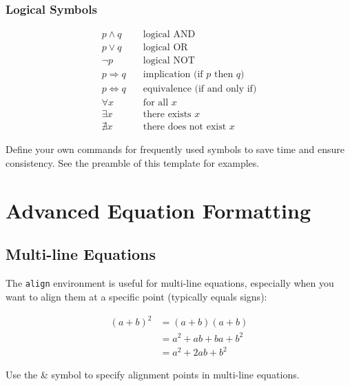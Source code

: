 \documentclass[11pt,a4paper]{article}
\begin{document}
\subsubsection{Logical Symbols}
\begin{align}
    p \land q &\quad \text{logical AND} \\
    p \lor q &\quad \text{logical OR} \\
    \neg p &\quad \text{logical NOT} \\
    p \Rightarrow q &\quad \text{implication (if $p$ then $q$)} \\
    p \Leftrightarrow q &\quad \text{equivalence (if and only if)} \\
    \forall x &\quad \text{for all $x$} \\
    \exists x &\quad \text{there exists $x$} \\
    \nexists x &\quad \text{there does not exist $x$}
\end{align}

\begin{tipbox}
Define your own commands for frequently used symbols to save time and ensure consistency. See the preamble of this template for examples.
\end{tipbox}

\section{Advanced Equation Formatting}

\subsection{Multi-line Equations}

The \verb|align| environment is useful for multi-line equations, especially when you want to align them at a specific point (typically equals signs):

\begin{align}
    (a + b)^2 &= (a + b)(a + b) \\
    &= a^2 + ab + ba + b^2 \\
    &= a^2 + 2ab + b^2
\end{align}

\begin{notebox}
Use the \& symbol to specify alignment points in multi-line equations.
\end{notebox}
\end{document}

